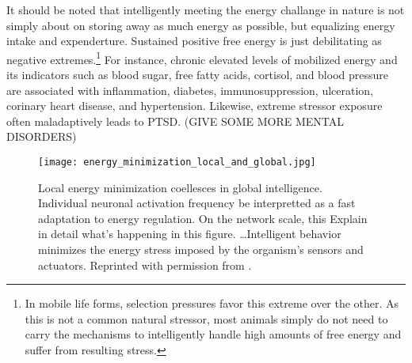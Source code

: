 It should be noted that intelligently meeting the energy challange in nature is not simply about on storing away as much energy as possible, but equalizing energy intake and expenderture. Sustained positive free energy is just debilitating as negative extremes.\footnote{In mobile life forms, selection pressures favor this extreme over the other. As this is not a common natural stressor, most animals simply do not need to carry the mechanisms to intelligently handle high amounts of free energy and suffer from resulting stress. } For instance, chronic elevated levels of mobilized energy and its indicators such as blood sugar, free fatty acids, cortisol, and blood pressure are associated with inflammation, diabetes, immunosuppression, ulceration, corinary heart disease, and hypertension. Likewise, extreme stressor exposure often maladaptively leads to PTSD. (GIVE SOME MORE MENTAL DISORDERS)

\begin{wrapfigure}{r}{0.5\textwidth}
 \centering
 \texttt{[image: energy\_minimization\_local\_and\_global.jpg]}
 \label{fig:2.2}
 \caption{Local energy minimization coellesces in global intelligence. Individual neuronal activation frequency be interpretted as a fast adaptation to energy regulation. On the network scale, this   Explain in detail what's happening in this figure. \dots Intelligent behavior minimizes the energy stress imposed by the organism's sensors and actuators. Reprinted with permission from \cite{Vergara2019}.}
\end{wrapfigure}

